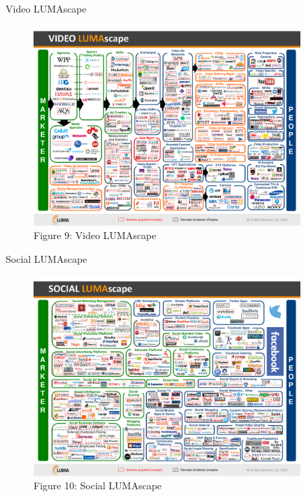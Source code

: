 \documentclass[pdf]{beamer}
\theoremstyle{remark}
\theoremstyle{definition}
\begin{document}
\begin{frame}[t]{Video LUMAscape}
\begin{figure}[htbp]
    \centering
    \captionsetup{justification=centering}
   \includegraphics[clip, trim=0cm 0.2cm 0cm 0.2cm, width=0.9\textwidth]{Images/Video_LUMAscape.pdf}  
     \caption{Figure {\color{franklinblue} 9}: Video LUMAscape}
    \label{fig:videoluma}
\end{figure}
\end{frame}

\begin{frame}[t]{Social LUMAscape}
\begin{figure}[htbp]
    \centering
    \captionsetup{justification=centering}
   \includegraphics[clip, trim=0cm 0.2cm 0cm 0.2cm, width=0.9\textwidth]{Images/Social_LUMAscape.pdf}  
     \caption{Figure {\color{franklinblue} 10}: Social LUMAscape}
    \label{fig:socialluma}
\end{figure}
\end{frame}
\end{document}
